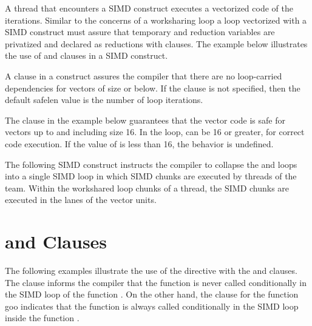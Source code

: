 A thread that encounters a SIMD construct executes a vectorized code of the 
iterations. Similar to the concerns of a worksharing loop a loop vectorized 
with a SIMD construct must assure that temporary and reduction variables are 
privatized and declared as reductions with clauses.  The example below 
illustrates the use of  and  clauses in a SIMD 
construct.




A  clause in a  construct assures the compiler that 
there are no loop-carried dependencies for vectors of size  or below. If 
the  clause is not specified, then the default safelen value is 
the number of loop iterations.
 
The  clause in the example below guarantees that the vector 
code is safe for vectors up to and including size 16.  In the loop,  can 
be 16 or greater, for correct code execution.  If the value of  is less 
than 16, the behavior is undefined.



The following SIMD construct instructs the compiler to collapse the  and 
 loops into a single SIMD loop in which SIMD chunks are executed by 
threads of the team. Within the workshared loop chunks of a thread, the SIMD 
chunks are executed in the lanes of the vector units.




\section{ and  Clauses}
\label{sec:SIMD_branch}

The following examples illustrate the use of the   
directive with the  and  clauses. The 
 clause informs the compiler that the function  is 
never called conditionally in the SIMD loop of the function . On 
the other hand, the  clause for the function goo indicates that 
the function is always called conditionally in the SIMD loop inside 
the function .


